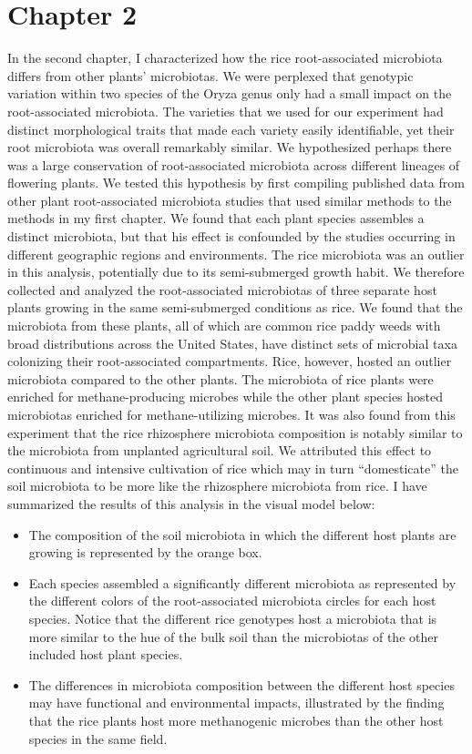 \section{Chapter 2}
In the second chapter, I characterized how the rice root-associated microbiota differs from other plants' microbiotas. We were perplexed that genotypic variation within two species of the Oryza genus only had a small impact on the root-associated microbiota. The varieties that we used for our experiment had distinct morphological traits that made each variety easily identifiable, yet their root microbiota was overall remarkably similar. We hypothesized perhaps there was a large conservation of root-associated microbiota across different lineages of flowering plants. We tested this hypothesis by first compiling published data from other plant root-associated microbiota studies that used similar methods to the methods in my first chapter. We found that each plant species assembles a distinct microbiota, but that his effect is confounded by the studies occurring in different geographic regions and environments. The rice microbiota was an outlier in this analysis, potentially due to its semi-submerged growth habit. We therefore collected and analyzed the root-associated microbiotas of three separate host plants growing in the same semi-submerged conditions as rice. We found that the microbiota from these plants, all of which are common rice paddy weeds with broad distributions across the United States, have distinct sets of microbial taxa colonizing their root-associated compartments. Rice, however, hosted an outlier microbiota compared to the other plants. The microbiota of rice plants were enriched for methane-producing microbes while the other plant species hosted microbiotas enriched for methane-utilizing microbes. It was also found from this experiment that the rice rhizosphere microbiota composition is notably similar to the microbiota from unplanted agricultural soil. We attributed this effect to continuous and intensive cultivation of rice which may in turn ``domesticate'' the soil microbiota to be more like the rhizosphere microbiota from rice. I have summarized the results of this analysis in the visual model below:

\begin{itemize}
\item The composition of the soil microbiota in which the different host plants are growing is represented by the orange box.
\item Each species assembled a significantly different microbiota as represented by the different colors of the root-associated microbiota circles for each host species. Notice that the different rice genotypes host a microbiota that is more similar to the hue of the bulk soil than the microbiotas of the other included host plant species.
\item The differences in microbiota composition between the different host species may have functional and environmental impacts, illustrated by the finding that the rice plants host more methanogenic microbes than the other host species in the same field.
\end{itemize}

